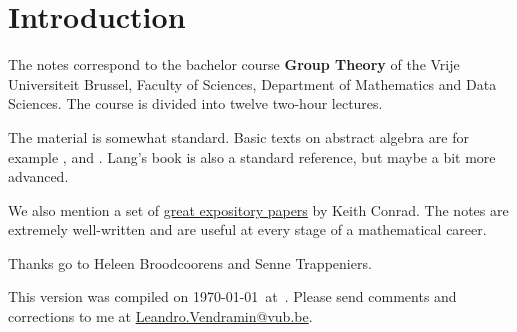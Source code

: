 \thispagestyle{plain}
\section*{Introduction}

The notes correspond to the bachelor 
course \textbf{Group Theory} of the 
Vrije Universiteit Brussel, 
Faculty of Sciences, 
Department of Mathematics and Data Sciences. The course
is divided into twelve two-hour lectures. 

The material is somewhat standard. Basic texts on abstract algebra
are for example \cite{MR1129886}, \cite{MR2286236} and \cite{MR600654}. 
Lang's book \cite{MR783636} is also a standard reference, but 
maybe a bit more advanced. 

We also mention a set of 
\href{https://kconrad.math.uconn.edu/blurbs/}{great expository papers} by Keith Conrad. 
The notes are extremely well-written and are useful at  
every stage of a mathematical career. 


 Thanks go to Heleen Broodcoorens and 
 Senne Trappeniers. 

This version 
was compiled on \today~at~\currenttime. 
Please send comments and corrections to me at \url{Leandro.Vendramin@vub.be}. 


